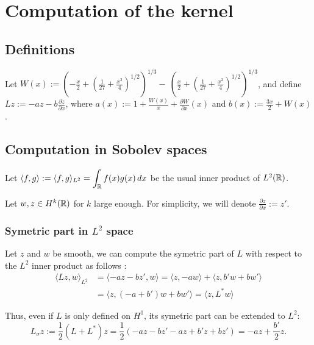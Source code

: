 \documentclass[11pt,a4paper]{article}
\begin{document}
\section{Computation of the kernel}

\subsection{Definitions}

Let $W(x) := \left( -\frac{x}{2} + \left( \frac{1}{27} + \frac{x^2}{4} \right)^{1/2} \right)^{1/3} -\  \left( \frac{x}{2} + \left( \frac{1}{27} + \frac{x^2}{4} \right)^{1/2} \right)^{1/3}$, 
and define $Lz := -az - b\frac{\partial z}{\partial x} $, where $a(x):= 1+\frac{W(x)}{x}+\frac{\partial W}{\partial x} (x)$ and $b(x):= \frac{3x}{2} + W(x)$.

\subsection{Computation in Sobolev spaces}

Let $\langle f, g \rangle := \langle f, g \rangle_{L^2} = \displaystyle \int_\mathbb R  f(x)g(x)\,dx$ be the usual inner product of $L^2(\mathbb R)$.

Let $w,z \in H^k(\mathbb R)$ for $k$ large enough. For simplicity, we will denote $\frac{\partial z}{\partial x} := z'$.

\subsubsection{Symetric part in $L^2$ space}
Let $z$ and $w$ be smooth, we can compute the symetric part of $L$ with respect to the $L^2$ inner product as follows :
\begin{align*}
  \langle Lz, w \rangle_{L^2}  &=   \langle -az - bz', w \rangle =  \langle z, -aw \rangle  +   \langle z, b'w+bw' \rangle    \\
                  &= \langle z, (-a+b')w + bw' \rangle = \langle z, L^*w \rangle
\end{align*}

Thus, even if $L$ is only defined on $H^1$, its symetric part can be extended to $L^2$:\[L_\sigma z := \frac{1}{2}(L+L^*)z = \frac{1}{2}(-az-bz' -az +b'z+bz') \displaystyle =-az+\frac{b'}{2}z. \]
\end{document}
